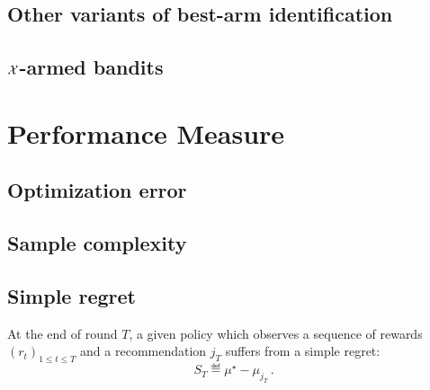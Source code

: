 \subsection{Other variants of best-arm identification}

\subsection{$\mathcal{X}$-armed bandits}

\section{Performance Measure}\label{sec:mab.performance}

\subsection{Optimization error}

\subsection{Sample complexity}

\subsection{Simple regret}

\begin{definition}\label{def:stoch_mab.simple_regret}
\begin{leftbar}[defnbar]
	At the end of round $T$, a given policy which observes a sequence of rewards $(r_t)_{1 \leq t \leq T}$ and a recommendation $j_T$ suffers from a simple regret:
	\[
		S_T \eqdef \mu^{\star} - \mu_{j_T}\,.
	\]
\end{leftbar}
\end{definition}